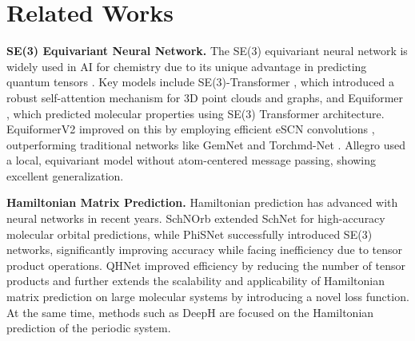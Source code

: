 \section{Related Works}
\textbf{SE(3) Equivariant Neural Network.} 
The SE(3) equivariant neural network is widely used in AI for chemistry due to its unique advantage in predicting quantum tensors \cite{fuchs2020se, du2022se, musaelian2023learning, liao2022equiformer, liao2023equiformerv2, batzner20223, batzner2023advancing}. Key models include SE(3)-Transformer \cite{fuchs2020se}, which introduced a robust self-attention mechanism for 3D point clouds and graphs, and Equiformer \cite{liao2022equiformer}, which predicted molecular properties using SE(3) Transformer architecture. EquiformerV2 \cite{liao2023equiformerv2} improved on this by employing efficient eSCN convolutions \cite{passaro2023reducing}, outperforming traditional networks like GemNet \cite{gasteiger2022gemnet} and Torchmd-Net \cite{tholke2022torchmd}. Allegro \cite{musaelian2023learning} used a local, equivariant model without atom-centered message passing, showing excellent generalization. 

\textbf{Hamiltonian Matrix Prediction.} 
Hamiltonian prediction has advanced with neural networks in recent years. SchNOrb\cite{schutt2019unifying} extended SchNet \cite{schutt2017schnet} for high-accuracy molecular orbital predictions, while PhiSNet \cite{unke2021se} successfully introduced SE(3) networks, significantly improving accuracy while facing inefficiency due to tensor product operations. QHNet \cite{yu2023efficient} improved efficiency by reducing the number of tensor products and \cite{huang2024enhancing} further extends the scalability and applicability of Hamiltonian matrix prediction on large molecular systems by introducing a novel loss function. At the same time, methods such as DeepH \cite{li2022deep} are focused on the Hamiltonian prediction of the periodic system.


